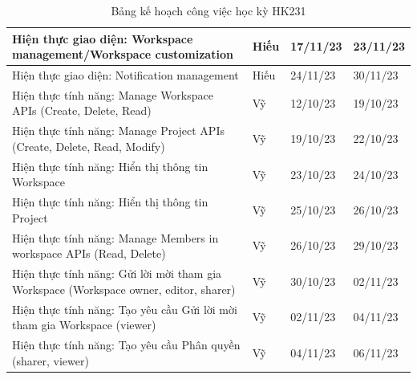 \begin{table}[H]
{\begin{tabular}{|p{11cm}|p{1.75cm}|p{1.5cm}|p{1.5cm}|}
    Hiện thực giao diện: Workspace management/Workspace customization       & Hiếu     & 17/11/23 & 23/11/23 \\ \hline
    Hiện thực giao diện: Notification management                            & Hiếu     & 24/11/23 & 30/11/23 \\ \hline
    Hiện thực tính năng: Manage Workspace APIs (Create, Delete, Read)       & Vỹ       & 12/10/23 & 19/10/23 \\ \hline
    Hiện thực tính năng: Manage Project APIs (Create, Delete, Read, Modify) & Vỹ       & 19/10/23 & 22/10/23 \\ \hline
    Hiện thực tính năng: Hiển thị thông tin Workspace                       & Vỹ       & 23/10/23 & 24/10/23 \\ \hline
    Hiện thực tính năng: Hiển thị thông tin Project                         & Vỹ       & 25/10/23 & 26/10/23 \\ \hline
    Hiện thực tính năng: Manage Members in workspace APIs (Read, Delete)    & Vỹ       & 26/10/23 & 29/10/23 \\ \hline
    Hiện thực tính năng: Gửi lời mời tham gia Workspace (Workspace owner, editor, sharer) & Vỹ       & 30/10/23 & 02/11/23 \\ \hline
    Hiện thực tính năng: Tạo yêu cầu Gửi lời mời tham gia Workspace (viewer)              & Vỹ       & 02/11/23 & 04/11/23 \\ \hline
    Hiện thực tính năng: Tạo yêu cầu Phân quyền (sharer, viewer)            & Vỹ       & 04/11/23 & 06/11/23 \\ \hline
    \end{tabular}%
    }
    \caption{Bảng kế hoạch công việc học kỳ HK231}
\end{table}

